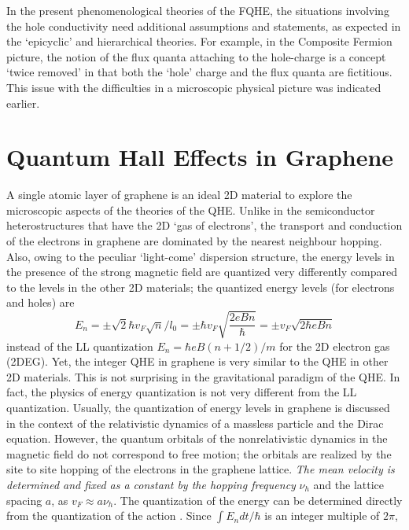 \documentclass[aps,preprint,12pt,tightenlines]{revtex4}%
\begin{document}
In the present phenomenological theories of the FQHE, the situations involving
the hole conductivity need additional assumptions and statements, as expected
in the `epicyclic' and hierarchical theories. For example, in the Composite
Fermion picture, the notion of the flux quanta attaching to the hole-charge is
a concept `twice removed' in that both the `hole' charge and the flux quanta
are fictitious. This issue with the difficulties in a microscopic physical
picture was indicated earlier.

\section{Quantum Hall Effects in Graphene}

A single atomic layer of graphene is an ideal 2D material \cite{Graphene-rev}
to explore the microscopic aspects of the theories of the QHE. Unlike in the
semiconductor heterostructures that have the 2D `gas of electrons', the
transport and conduction of the electrons in graphene are dominated by the
nearest neighbour hopping. Also, owing to the peculiar `light-come' dispersion
structure, the energy levels in the presence of the strong magnetic field are
quantized very differently compared to the levels in the other 2D materials;
the quantized energy levels (for electrons and holes) are
\begin{equation}
E_{n}=\pm\sqrt{2}\hbar v_{F}\sqrt{n}/l_{0}=\pm\hbar v_{F}\sqrt{\frac
{2eBn}{\hbar}}=\pm v_{F}\sqrt{2\hbar eBn}%
\end{equation}
instead of the LL quantization $E_{n}=\hbar eB\left(  n+1/2\right)
/m$ for the 2D electron gas (2DEG). Yet, the integer QHE in graphene is very
similar to the QHE in other 2D materials. This is not surprising in the
gravitational paradigm of the QHE. In fact, the physics of energy quantization
is not very different from the LL quantization. Usually, the
quantization of energy levels in graphene is discussed in the context of the
relativistic dynamics of a massless particle and the Dirac equation. However,
the quantum orbitals of the nonrelativistic dynamics in the magnetic field do
not correspond to free motion; the orbitals are realized by the site to site
hopping of the electrons in the graphene lattice. \emph{The mean velocity is
determined and fixed as a constant by the hopping frequency} $\nu_{h}$ and the
lattice spacing $a$, as $v_{F}\approx a\nu_{h}$. The quantization of the
energy can be determined directly from the quantization of the action
\cite{Unni-RQM}. Since $\int E_{n}dt/\hbar$ is an integer multiple of $2\pi$,
\end{document}
